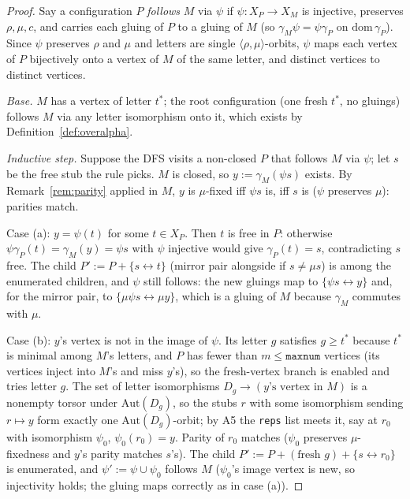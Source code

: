 \documentclass[11pt]{article}
\theoremstyle{definition}
\newcommand{\Aut}{\mathrm{Aut}}
\begin{document}
\begin{proof}
Say a configuration $P$ \emph{follows} $M$ via $\psi$ if $\psi : X_P \to X_M$ is
injective, preserves $\rho, \mu, c$, and carries each gluing of $P$ to a gluing of $M$
(so $\gamma_M \psi = \psi \gamma_P$ on $\mathrm{dom}\,\gamma_P$). Since $\psi$ preserves
$\rho$ and $\mu$ and letters are single $\langle\rho,\mu\rangle$-orbits, $\psi$ maps each
vertex of $P$ bijectively onto a vertex of $M$ of the same letter, and distinct vertices
to distinct vertices.

\emph{Base.} $M$ has a vertex of letter $t^\ast$; the root configuration (one fresh
$t^\ast$, no gluings) follows $M$ via any letter isomorphism onto it, which exists by
Definition~\ref{def:overalpha}.

\emph{Inductive step.} Suppose the DFS visits a non-closed $P$ that follows $M$ via
$\psi$; let $s$ be the free stub the rule picks. $M$ is closed, so
$y := \gamma_M(\psi s)$ exists. By Remark~\ref{rem:parity} applied in $M$, $y$ is
$\mu$-fixed iff $\psi s$ is, iff $s$ is ($\psi$ preserves $\mu$): parities match.

Case (a): $y = \psi(t)$ for some $t \in X_P$. Then $t$ is free in $P$: otherwise
$\psi\gamma_P(t) = \gamma_M(y) = \psi s$ with $\psi$ injective would give
$\gamma_P(t) = s$, contradicting $s$ free. The child $P' := P + \{s \leftrightarrow t\}$
(mirror pair alongside if $s \ne \mu s$) is among the enumerated children, and $\psi$
still follows: the new gluings map to $\{\psi s \leftrightarrow y\}$ and, for the mirror
pair, to $\{\mu\psi s \leftrightarrow \mu y\}$, which is a gluing of $M$ because
$\gamma_M$ commutes with $\mu$.

Case (b): $y$'s vertex is not in the image of $\psi$. Its letter $g$ satisfies
$g \ge t^\ast$ because $t^\ast$ is minimal among $M$'s letters, and $P$ has fewer than
$m \le \texttt{maxnum}$ vertices (its vertices inject into $M$'s and miss $y$'s), so the
fresh-vertex branch is enabled and tries letter $g$. The set of letter isomorphisms
$D_g \to (\text{$y$'s vertex in } M)$ is a nonempty torsor under $\Aut(D_g)$, so the
stubs $r$ with some isomorphism sending $r \mapsto y$ form exactly one
$\Aut(D_g)$-orbit; by A5 the \texttt{reps} list meets it, say at $r_0$ with isomorphism
$\psi_0$, $\psi_0(r_0) = y$. Parity of $r_0$ matches ($\psi_0$ preserves $\mu$-fixedness
and $y$'s parity matches $s$'s). The child
$P' := P + (\text{fresh } g) + \{s \leftrightarrow r_0\}$ is enumerated, and
$\psi' := \psi \cup \psi_0$ follows $M$ ($\psi_0$'s image vertex is new, so injectivity
holds; the gluing maps correctly as in case (a)).


\end{proof}
\end{document}

